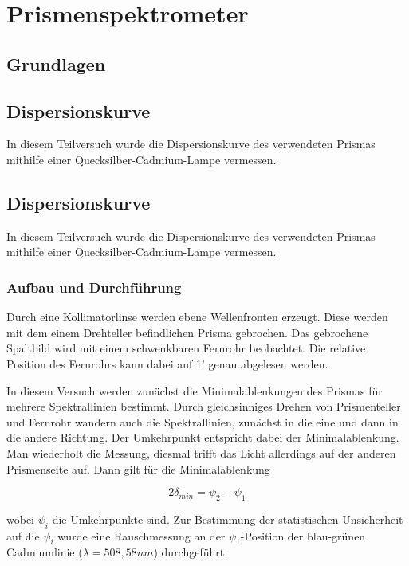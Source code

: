\documentclass[12pt,a4paper]{article}
\author{Tim}
\begin{document}
\tableofcontents
\newpage

\section{Prismenspektrometer}

\subsection{Grundlagen}

\subsection{Dispersionskurve}
In diesem Teilversuch wurde die Dispersionskurve des verwendeten Prismas mithilfe einer Quecksilber-Cadmium-Lampe vermessen.

\subsection{Dispersionskurve}
In diesem Teilversuch wurde die Dispersionskurve des verwendeten Prismas mithilfe einer Quecksilber-Cadmium-Lampe vermessen.

\subsubsection{Aufbau und Durchführung}
Durch eine Kollimatorlinse werden ebene Wellenfronten erzeugt. Diese werden mit dem einem Drehteller befindlichen Prisma gebrochen. Das gebrochene Spaltbild wird mit einem schwenkbaren Fernrohr beobachtet. Die relative Position des Fernrohrs kann dabei auf 1' genau abgelesen werden.

In diesem Versuch werden zunächst die Minimalablenkungen des Prismas für mehrere Spektrallinien bestimmt.
Durch gleichsinniges Drehen von Prismenteller und Fernrohr wandern auch die Spektrallinien, zunächst in die eine und dann in die andere Richtung. Der Umkehrpunkt entspricht dabei der Minimalablenkung. Man wiederholt die Messung, diesmal trifft das Licht allerdings auf der anderen Prismenseite auf. Dann gilt für die Minimalablenkung

\begin{equation}
2 \delta_{min} = \psi_2-\psi_1
\end{equation}

wobei $\psi_i$ die Umkehrpunkte sind.
Zur Bestimmung der statistischen Unsicherheit auf die $\psi_i$ wurde eine Rauschmessung an der $\psi_1$-Position der blau-grünen Cadmiumlinie ($\lambda=508,58nm$) durchgeführt.
\end{document}
